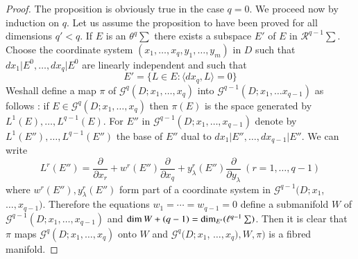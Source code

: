 \begin{proof}
  The proposition is obviously true in the case $q = 0$. We proceed
  now by induction on $q$. Let us assume the proposition to have been
  proved for all dimensions $q' < q$. If $E$ is an $\theta^q \sum $
  there exists a subspace $E'$ of $E$ in $\mathscr{R}^{q-1}
  \sum$. Choose the coordinate system $(x_1,  \ldots ,  x_q,  y_1 ,
  \ldots ,  y_m)$ in $D$ such that $dx_1 \big | E^0 ,  \ldots ,  dx_q
  \big | E^0$ are linearly independent and such that 
  $$
  E' = \{ L \in E : \langle dx_q ,  L \rangle= 0 \}
  $$
  We\pageoriginale shall define a map $\pi$ of $\mathscr{G}^q (D; x_1,  \ldots ,
  x_q)$ into $\mathscr{G}^{q-1} (D; x_1 ,  \ldots x_{q-1})$ as follows :
  if $E \in \mathscr{G}^q (D; x_1,  \ldots ,  x_q)$ then $\pi(E)$ is the
  space generated by $L^1 (E),  \ldots ,  L^{q-1}(E)$. For $E''$ in
  $\mathscr{G}^{q-1} (D; x_1 ,  \ldots ,  x_{q-1})$ denote by $L^1 (E'')
  ,  \ldots ,  L^{q-1}(E'')$ the base of $E''$ dual to $dx_1 \big | E''
  ,  \ldots ,  dx_{q-1} \big | E''$. We can write 
  $$
  L^r (E'') = \frac{\partial}{\partial x_r} + w^r (E'')
  \frac{\partial}{\partial x_q} + y^r_\lambda (E'')
  \frac{\partial}{\partial y_\lambda} ~ (r=1,  \ldots,  q-1) 
  $$
  where $w^r (E'') ,  y^r_\lambda (E'')$ form part of a coordinate
  system in $\mathscr{G}^{q-1} (D; x_1$,  $\ldots ,  x_{q-1})$. Therefore the
  equations $w_1 = \cdots = w_{q-1} = 0$ define a submanifold $W$ of
  $\mathscr{G}^{q-1} (D; x_1,  \ldots ,  x_{q-1})$ and $\dim W + (q-1) =
  \dim _{E'}\break (\ell ^{q-1} \sum )$. Then it is clear that $\pi$ maps
  $\mathscr{G}^q (D; x_1,  \ldots ,  x_q)$ onto $W$ and $\mathscr{G}^q
  (D; x_1$,  $\ldots ,  x_q),  W,  \pi)$ is a fibred manifold. 
\end{proof}

